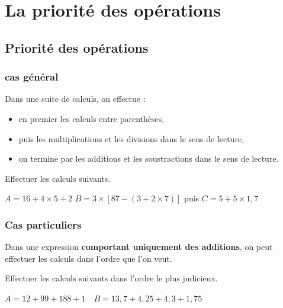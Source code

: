 \documentclass[a4paper]{book}
\begin{document}
\setcounter{chapter}{2}
\renewcommand{\monTitre}{La priorité des opérations}
\chapter{\monTitre}
\thispagestyle{fancy} 

\section{Priorité des opérations}
\subsection{cas général}

    \begin{convention}
        Dans une suite de calculs, on effectue :
        \begin{itemize}
            \item en premier les calculs entre parenthèses,
            \item puis les multiplications et les divisions dans le sens de lecture,
            \item on termine par les additions et les soustractions dans le sens de lecture.
        \end{itemize}
    \end{convention}
    
    \begin{exemple}
        Effectuer les calculs suivants.
        
        \(A = 16 + 4 \times 5\div2 \) \quad 
        \( B = 3\times[87-(3+2\times7)]\)
        puis $C=5+5\times1,7$
    \end{exemple}

\subsection{Cas particuliers}
    \begin{propriete}
        Dans une expression \textbf{comportant uniquement des additions}, on peut effectuer les calculs dans l'ordre que l'on veut.
    \end{propriete}

    \begin{exemple}
        Effectuer les calculs suivants dans l'ordre le plus judicieux.

        $A=12+ 99+ 188+ 1 \quad
        B=13,7+4,25+4,3+1,75$
    \end{exemple}
\end{document}
